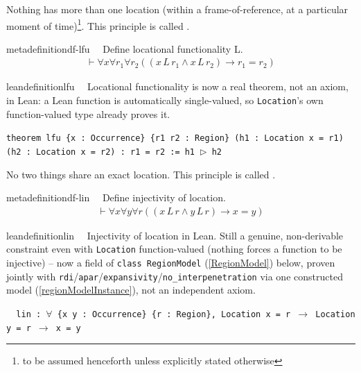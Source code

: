\pn Nothing has more than one location (within a frame-of-reference, at a particular moment of time)\footnote{to be assumed henceforth unless explicitly stated otherwise}.  This principle is called .
\begin{restatable}{metadefinition}{df-lfu}~~ Define locational functionality L.
\begin{align}
\vdash \forall x \forall r_1 \forall r_2 ( ( x \,L \,r_1 \wedge x \,L \,r_2 )
    \rightarrow r_1 = r_2 )\label{eq:df-lfu}\tag{df-lfu}
\end{align}
\end{restatable}

\begin{restatable}{leandefinition}{lfu}~~ Locational functionality is now a real theorem, not an
axiom, in Lean: a Lean function is automatically single-valued, so \texttt{Location}'s own function-valued type
already proves it.

\texttt{\textcolor{leancolor}{theorem} \textcolor{leanyellow}{lfu} \{x : Occurrence\} \{r1 r2 : Region\} (h1 : Location x = r1) (h2 : Location x = r2) : r1 = r2 := h1 $\triangleright$ h2}
\label{lfu}
\end{restatable}

\pn No two things share an exact location.  This principle is called .
\begin{restatable}{metadefinition}{df-lin}~~ Define injectivity of location.
\begin{align}
\vdash \forall x \forall y \forall r ( ( x \,L \,r \wedge y \,L \,r ) \rightarrow x =
    y )\label{eq:df-lin}\tag{df-lin}
\end{align}
\end{restatable}

\begin{restatable}{leandefinition}{lin}~~ Injectivity of location in Lean. Still a genuine,
non-derivable constraint even with \texttt{Location} function-valued (nothing forces a function to be
injective) -- now a field of \texttt{class RegionModel} (\ref{RegionModel}) below, proven jointly with
\texttt{rdi}/\texttt{apar}/\texttt{expansivity}/\texttt{no\_interpenetration} via one constructed model
(\ref{regionModelInstance}), not an independent axiom.

\texttt{~~lin : $\forall$ \{x y : Occurrence\} \{r : Region\}, Location x = r $\to$ Location y = r $\to$ x = y}
\label{lin}
\end{restatable}

